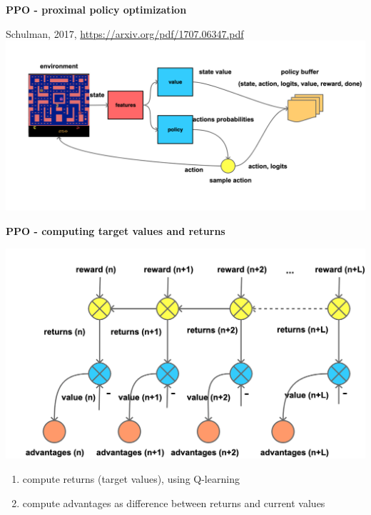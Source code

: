 \documentclass[xcolor=dvipsnames]{beamer}
\begin{document}
\begin{frame}{\bf PPO - proximal policy optimization}

Schulman, 2017, \url{https://arxiv.org/pdf/1707.06347.pdf} \\

\centering
\includegraphics[scale=0.12]{../diagrams/basic/ppo.png}

\end{frame}


\begin{frame}{\bf PPO - computing target values and returns}

  \centering
  \includegraphics[scale=0.12]{../diagrams/basic/pporeturns.png}

  \begin{enumerate}
    \item compute returns (target values), using Q-learning
    \item compute advantages as difference between returns and current values
  \end{enumerate}

\end{frame}
\end{document}
